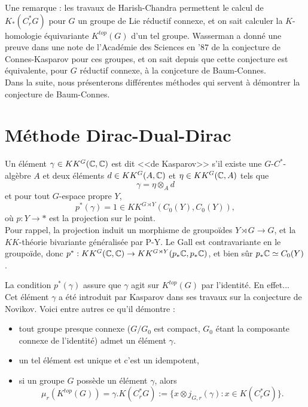 Une remarque : les travaux de Harish-Chandra permettent le calcul de $K_*(C^*_r G)$ pour $G$ un groupe de Lie réductif connexe, et on sait calculer la $K$-homologie équivariante $K^{top}(G)$ d'un tel groupe. Wasserman a donné une preuve dans une note de l'Académie des Sciences en '$87$ de la conjecture de Connes-Kasparov pour ces groupes, et on sait depuis que cette conjecture est équivalente, pour $G$ réductif connexe, à la conjceture de Baum-Connes.\\

Dans la suite, nous présenterons différentes méthodes qui servent à démontrer la conjecture de Baum-Connes.\\

\section{Méthode Dirac-Dual-Dirac}

\begin{definition}
Un élément $\gamma \in KK^{G}(\mathbb C,\mathbb C)$ est dit <<de Kasparov>> s'il existe une $G$-$C^*$-algèbre $A$ et deux éléments $d\in KK^{G}(A,\mathbb C)$ et $\eta \in KK^{G}(\mathbb C,A)$ tels que
\[\gamma = \eta \otimes_A d \]
et pour tout $G$-espace propre $Y$,
\[p^*(\gamma)=1\in KK^{G\rtimes Y}(C_0(Y),C_0(Y)),\]
où $p : Y\rightarrow *$ est la projection sur le point. \\

Pour rappel, la projection induit un morphisme de groupoïdes $Y \rtimes G\rightarrow G$, et la $KK$-théorie bivariante généralisée par P-Y. Le Gall est contravariante en le groupoïde, donc $p^* : KK^G(\mathbb C,\mathbb C)\rightarrow KK^{G\rtimes Y}(p_* \mathbb C,p_* \mathbb C)$, et bien sûr $p_*\mathbb C \simeq C_0(Y)$.
\end{definition}%

La condition $p^*(\gamma)$ assure que $\gamma$ agit sur $K^{top}(G)$ par l'identité. En effet...\\

Cet élément $\gamma$ a été introduit par Kasparov dans ses travaux sur la conjecture de Novikov. Voici entre autres ce qu'il démontre :
\begin{itemize}
\item tout groupe presque connexe ($G/G_0$ est compact, $G_0$ étant la composante connexe de l'identité) admet un élément $\gamma$.
\item un tel élément est unique et c'est un idempotent,
\item si un groupe $G$ possède un élément $\gamma$, alors 
\[\mu_r(K^{top}(G)) = \gamma.K(C^*_r G) := \{x\otimes j_{G,r}(\gamma) : x\in K(C^*_r G)\}.\]
\end{itemize}

